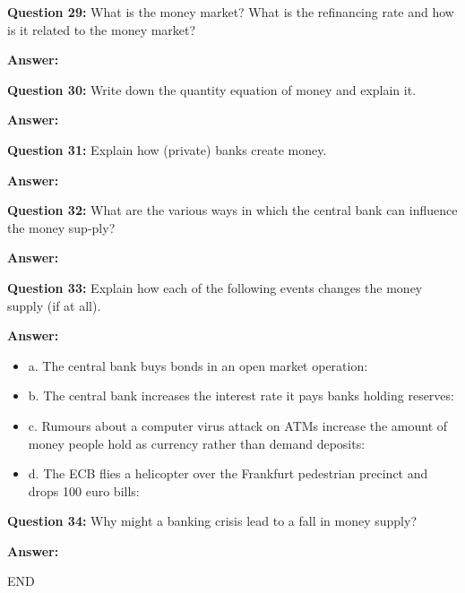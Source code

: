 \documentclass[a4paper, 11pt]{article}
\begin{document}
\textbf{Question 29:} What is the money market? What is the refinancing rate and how is it related to the money market?

\textbf{Answer:} 

\textbf{Question 30:} Write down the quantity equation of money and explain it.

\textbf{Answer:} 

\textbf{Question 31:} Explain how (private) banks create money.

\textbf{Answer:} 

\textbf{Question 32:} What are the various ways in which the central bank can influence the money sup-ply?

\textbf{Answer:} 

\textbf{Question 33:} Explain how each of the following events changes the money supply (if at all).

\textbf{Answer:} 

\begin{itemize}
\item a. The central bank buys bonds in an open market operation:
\item b. The central bank increases the interest rate it pays banks holding reserves:
\item c. Rumours about a computer virus attack on ATMs increase the amount of money people hold as currency rather than demand deposits:
\item d. The ECB flies a helicopter over the Frankfurt pedestrian precinct and drops 100 euro bills:
\end{itemize}

\textbf{Question 34:} Why might a banking crisis lead to a fall in money supply?

\textbf{Answer:} 


\centering
END
\end{document}
